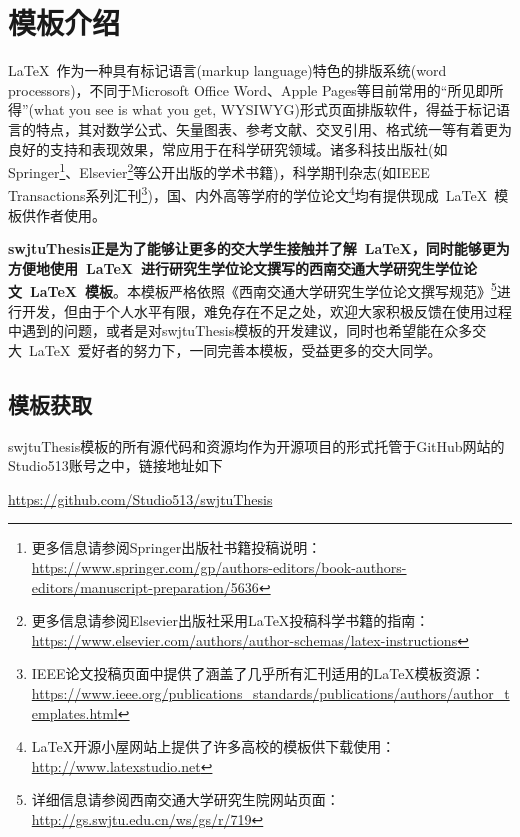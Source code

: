 
\chapter{模板介绍}

\LaTeX{}~作为一种具有标记语言(markup language)特色的排版系统(word processors)，不同于Microsoft Office Word\textsuperscript{\textregistered}、Apple Pages\textsuperscript{\textregistered}等目前常用的“所见即所得”(what you see is what you get, WYSIWYG)形式页面排版软件，得益于标记语言的特点，其对数学公式、矢量图表、参考文献、交叉引用、格式统一等有着更为良好的支持和表现效果，常应用于在科学研究领域。诸多科技出版社(如Springer\footnote{更多信息请参阅Springer出版社书籍投稿说明：\url{https://www.springer.com/gp/authors-editors/book-authors-editors/manuscript-preparation/5636}}、Elsevier\footnote{更多信息请参阅Elsevier出版社采用\LaTeX{}投稿科学书籍的指南：\url{https://www.elsevier.com/authors/author-schemas/latex-instructions}}等公开出版的学术书籍)，科学期刊杂志(如IEEE Transactions系列汇刊\footnote{IEEE论文投稿页面中提供了涵盖了几乎所有汇刊适用的\LaTeX{}模板资源：\url{https://www.ieee.org/publications_standards/publications/authors/author_templates.html}})，国、内外高等学府的学位论文\footnote{\LaTeX 开源小屋网站上提供了许多高校的模板供下载使用：\url{http://www.latexstudio.net}}均有提供现成~\LaTeX{}~模板供作者使用。

\par
\textbf{swjtuThesis正是为了能够让更多的交大学生接触并了解~\LaTeX{}，同时能够更为方便地使用~\LaTeX{}~进行研究生学位论文撰写的西南交通大学研究生学位论文~\LaTeX{}~模板}。本模板严格依照《西南交通大学研究生学位论文撰写规范》\footnote{详细信息请参阅西南交通大学研究生院网站页面：\url{http://gs.swjtu.edu.cn/ws/gs/r/719}}进行开发，但由于个人水平有限，难免存在不足之处，欢迎大家积极反馈在使用过程中遇到的问题，或者是对swjtuThesis模板的开发建议，同时也希望能在众多交大~\LaTeX{}~爱好者的努力下，一同完善本模板，受益更多的交大同学。


\section{模板获取}

swjtuThesis模板的所有源代码和资源均作为开源项目的形式托管于GitHub网站的Studio513账号之中，链接地址如下 
\par
\begin{center}
	\url{https://github.com/Studio513/swjtuThesis}
\end{center}

